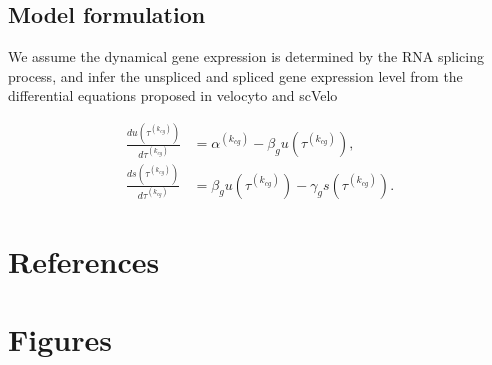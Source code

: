\documentclass[
  sn-mathphys-num,
  lineno,
  twocolumn]{sn-jnl}
\begin{document}
\subsection{Model formulation}\label{sec-model}

We assume the dynamical gene expression is determined by the RNA
splicing process, and infer the unspliced and spliced gene expression
level from the differential equations proposed in velocyto
\citep{La_Manno2018-lj} and scVelo \citep{Bergen2020-pj}

\begin{align}
\frac{d u\left(\tau^{\left(k_{cg}\right)}\right)}{d \tau^{\left(k_{cg}\right)}}
  &= \alpha^{\left(k_{cg}\right)}-\beta_g u\left(\tau^{\left(k_{cg}\right)}\right), \label{eq-dudt}\\
\frac{d s\left(\tau^{\left(k_{cg}\right)}\right)}{d \tau^{\left(k_{cg}\right)}}
  &= \beta_g u\left(\tau^{\left(k_{cg}\right)}\right)-\gamma_g s\left(\tau^{\left(k_{cg}\right)}\right). \label{eq-dsdt}
\end{align}

\newpage{}

\onecolumn

\section{References}\label{references}

\renewcommand{\bibsection}{}


\FloatBarrier

\newpage{}

\section{Figures}\label{figures}
\end{document}
